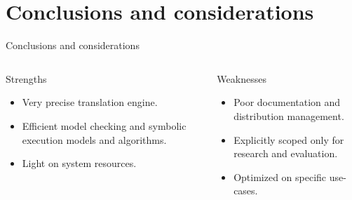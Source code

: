 \documentclass[aspectratio=1610,10.5pt]{beamer} %
\begin{document}


\section{Conclusions and considerations}

\begin{frame}{Conclusions and considerations}
    \begin{columns}
        \begin{column}{0.47\textwidth}
            \begin{block}{Strengths}
                \begin{itemize}
                    \item Very precise translation engine.
                    \item Efficient model checking and symbolic execution models and algorithms.
                    \item Light on system resources.
                \end{itemize}
            \end{block}
        \end{column}
        \begin{column}{0.50\textwidth}
            \begin{block}{Weaknesses}
                \begin{itemize}
                    \item Poor documentation and distribution management.
                    \item Explicitly scoped only for research and evaluation.
                    \item Optimized on specific use-cases.
                \end{itemize}
            \end{block}
        \end{column}
    \end{columns}

\end{frame}
\end{document}
